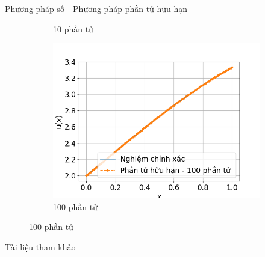 \documentclass[aspectratio=169, t]{beamer} %
\begin{document}
\begin{frame}{Phương pháp số - Phương pháp phần tử hữu hạn}
\begin{figure}[htbp]
\begin{subfigure}[b]{0.3\linewidth}
        \caption{10 phần tử}
    \end{subfigure}\hfill
    \begin{subfigure}[b]{0.3\linewidth}
        \centering
        \includegraphics[width=\linewidth]{Slides/Figure/PTHH_100el.png}
        \caption{100 phần tử}
    \end{subfigure}
\end{figure}
\end{frame}

\begin{frame}[allowframebreaks]{Tài liệu tham khảo}
    \nocite{*}
    \printbibliography
\end{frame}
\end{document}
